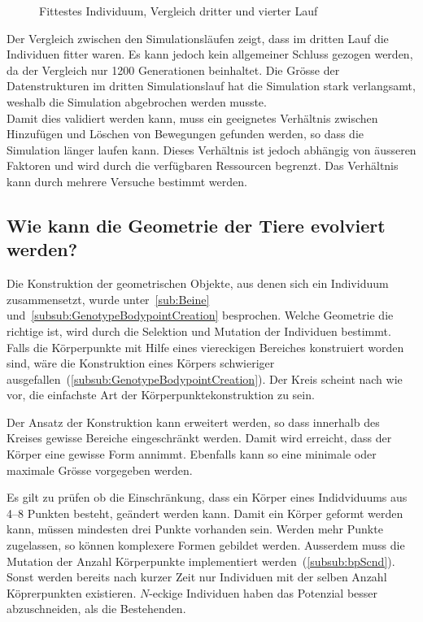       \begin{figure}[H]
        \centering
        
        \caption{Fittestes Individuum, Vergleich dritter und vierter Lauf}
      \end{figure}

      Der Vergleich zwischen den Simulationsläufen zeigt, dass im dritten Lauf die Individuen fitter waren.
      Es kann jedoch kein allgemeiner Schluss gezogen werden, da der Vergleich nur 1200 Generationen beinhaltet.
      Die Grösse der Datenstrukturen im dritten Simulationslauf hat die Simulation stark verlangsamt,
      weshalb die Simulation abgebrochen werden musste.
      \\
      Damit dies validiert werden kann,
      muss ein geeignetes Verhältnis zwischen Hinzufügen und Löschen von Bewegungen gefunden werden,
      so dass die Simulation länger laufen kann.
      Dieses Verhältnis ist jedoch abhängig von äusseren Faktoren und wird durch die verfügbaren Ressourcen begrenzt.
      Das Verhältnis kann durch mehrere Versuche bestimmt werden.

    \subsection{Wie kann die Geometrie der Tiere evolviert werden?}

      Die Konstruktion der geometrischen Objekte, aus denen sich ein Individuum zusammensetzt,
      wurde unter~\vref{sub:Beine} und~\vref{subsub:GenotypeBodypointCreation} besprochen.
      Welche Geometrie die richtige ist, wird durch die Selektion und Mutation der Individuen bestimmt.
      Falls die Körperpunkte mit Hilfe eines viereckigen Bereiches konstruiert worden sind,
      wäre die Konstruktion eines Körpers schwieriger ausgefallen~(\vref{subsub:GenotypeBodypointCreation}).
      Der Kreis scheint nach wie vor, die einfachste Art der Körperpunktekonstruktion zu sein.

      \smallskip

      Der Ansatz der Konstruktion kann erweitert werden,
      so dass innerhalb des Kreises gewisse Bereiche eingeschränkt werden.
      Damit wird erreicht, dass der Körper eine gewisse Form annimmt.
      Ebenfalls kann so eine minimale oder maximale Grösse vorgegeben werden.

      \smallskip

      Es gilt zu prüfen ob die Einschränkung, dass ein Körper eines Indidviduums aus 4--8 Punkten besteht,
      geändert werden kann.
      Damit ein Körper geformt werden kann, müssen mindesten drei Punkte vorhanden sein.
      Werden mehr Punkte zugelassen, so können komplexere Formen gebildet werden.
      Ausserdem muss die Mutation der Anzahl Körperpunkte implementiert werden~(\vref{subsub:bpScnd}).
      Sonst werden bereits nach kurzer Zeit nur Individuen mit der selben Anzahl Köprerpunkten existieren.
      \(N\)-eckige Individuen haben das Potenzial besser abzuschneiden, als die Bestehenden.

